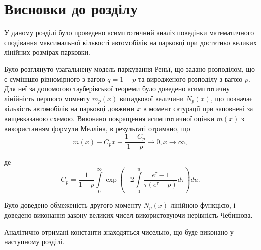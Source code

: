 \section*{Висновки до розділу}
У даному розділі було проведено асимптотичний аналіз поведінки математичного сподівання максимальної кількості автомобілів на парковці при достатньо великих лінійних розмірах парковки.

Було розглянуто узагальнену модель паркування Реньї, що задано розподілом, що є сумішшю рівномірного з вагою $q=1-p$ та виродженого розподілу з вагою $p$. Для неї за допомогою тауберівської теореми було доведено асимптотичну лінійність першого моменту $m_{p}(x)$ випадкової величини $N_{p}(x)$, що позначає кількість автомобілів на парковці довжини $x$ в момент сатурації при заповнені за вищевказаною схемою. Виконано покращення асимптотичної оцінки $m(x)$ з використанням формули Мелліна, в результаті отримано, що
\begin{equation*}
m(x) - C_{p} x - \frac{1 - C_{p}}{1 - p} \rightarrow 0, x \rightarrow \infty,
\end{equation*}

де
\begin{equation*}
C_{p} = \frac{1}{1-p} \int\limits_0^\infty \exp\left( -2\int\limits_0^u \frac{e^{\tau} - 1}{\tau(e^\tau - p)} d\tau  \right) du.
\end{equation*}

Було доведено обмеженість другого моменту $N_{p}(x)$ лінійною функцією, і доведено виконання закону великих чисел використовуючи нерівність Чебишова.

Аналітично отримані константи знаходяться чисельно, що буде виконано у наступному розділі.
